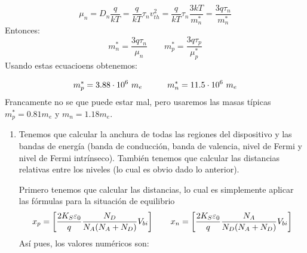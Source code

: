 \begin{equation}
    \mu_n = D_n \frac{q}{kT} = \frac{q}{kT} \tau_n v^2_{th} = \frac{q}{kT} \tau_n \frac{3kT}{m_n^*} = \frac{3q\tau_n}{m_n^*}
\end{equation}
Entonces:
\begin{equation}
    m_n^* = \frac{3q\tau_n}{\mu_n} \qquad m_p^* = \frac{3q\tau_p}{\mu_p^*}
\end{equation}
Usando estas ecuacioens obtenemos:

\begin{equation}
    m_p^* = 3.88 \cdot 10^6 \ m_e \quad \quad \quad m_n^* = 11.5 \cdot 10^6 \ m_e
\end{equation}
Francamente no se que puede estar mal, pero usaremos las masas típicas $m_p^* = 0.81m_e$ y $m_n=1.18 m_e$. 
\begin{enumerate}[label=\alph*)]
    \item Tenemos que calcular la anchura de todas las regiones del dispositivo y las bandas de energía (banda de conducción, banda de valencia, nivel de Fermi y nivel de Fermi intrínseco). También tenemos que calcular las distancias relativas entre los niveles (lo cual es obvio dado lo anterior). 
    
    Primero tenemos que calcular las distancias, lo cual es simplemente aplicar las fórmulas para la situación de equilibrio
    \begin{equation}
        x_p = \left[ \frac{2K_S\varepsilon_0}{q} \frac{N_D}{N_A(N_A+N_D)}  V_{bi} \right]   \qquad 
        x_n = \left[ \frac{2K_S\varepsilon_0}{q} \frac{N_A}{N_D(N_A+N_D)}  V_{bi} \right]
    \end{equation}
    Así pues, los valores numéricos son: 


\end{enumerate}
